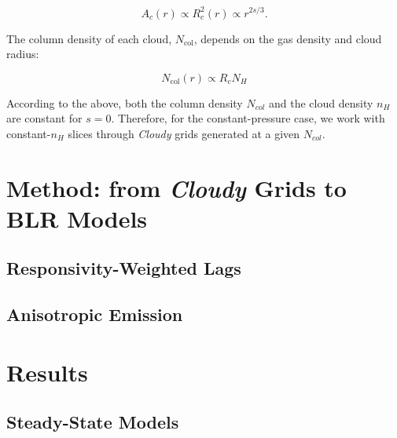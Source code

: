 \documentclass[paper=a4, fontsize=11pt]{scrartcl} %
\numberwithin{equation}{section} %
\numberwithin{figure}{section} %
\numberwithin{table}{section} %
\newcommand{\ncol}{\ensuremath{N_\mathrm{col}}}
\begin{document}
\begin{equation*}
A_c(r) \propto R_c^2(r) \propto r^{2s/3}.
\end{equation*}

The column density of each cloud, \ncol, depends on the gas density and cloud radius:

\begin{equation*}
\ncol(r)\propto R_cN_H
\end{equation*}

According to the above, both the column density $N_{col}$ and the cloud density $n_H$ are constant for $s=0$. Therefore, for the constant-pressure case, we work with constant-$n_H$ slices through \emph{Cloudy} grids generated at a given $N_{col}$.

\section{Method: from \emph{Cloudy} Grids to BLR Models}

\subsection{Responsivity-Weighted Lags}

\subsection{Anisotropic Emission}

\section{Results}

\subsection{Steady-State Models}\label{sec:results_steadystate}
\end{document}
